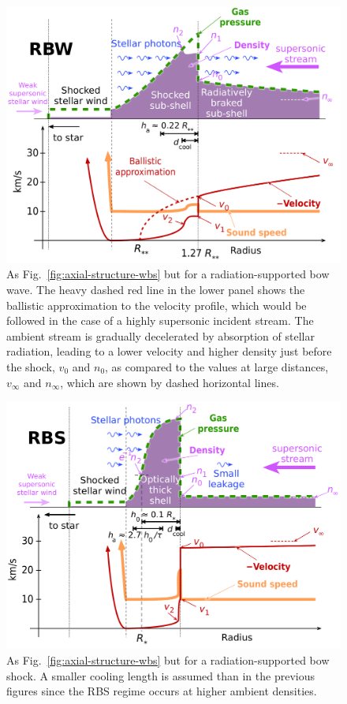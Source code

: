 \begin{figure}
  \centering
  \includegraphics[width=\linewidth]{figs/shell-profile-rbw}
  \caption{As Fig.~\ref{fig:axial-structure-wbs} but for a
    radiation-supported bow wave.  The heavy dashed red line in the
    lower panel shows the ballistic approximation to the velocity
    profile, which would be followed in the case of a highly
    supersonic incident stream.  The ambient stream is gradually
    decelerated by absorption of stellar radiation, leading to a lower
    velocity and higher density just before the shock, \(v_0\) and
    \(n_0\), as compared to the values at large distances,
    \(v_\infty\) and \(n_\infty\), which are shown by dashed horizontal lines.}
  \label{fig:axial-structure-rbw}
\end{figure}
\begin{figure}
  \centering
  \includegraphics[width=\linewidth]{figs/shell-profile-rbs}
  \caption{As Fig.~\ref{fig:axial-structure-wbs} but for a
    radiation-supported bow shock.  A smaller cooling length is assumed
    than in the previous figures since the RBS regime occurs at higher
    ambient densities.}
  \label{fig:axial-structure-rbs}
\end{figure}


